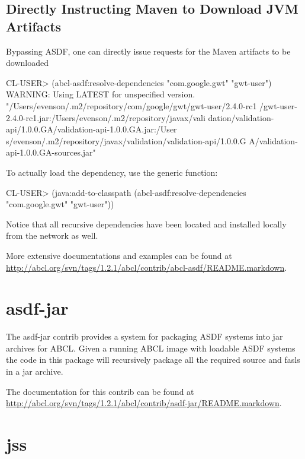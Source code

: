 \documentclass[10pt]{book}
\begin{document}
\subsection{Directly Instructing Maven to Download JVM Artifacts}

Bypassing \textsc{ASDF}, one can directly issue requests for the Maven
artifacts to be downloaded

\begin{listing-lisp}
CL-USER> (abcl-asdf:resolve-dependencies "com.google.gwt"
                                         "gwt-user")
WARNING: Using LATEST for unspecified version.
"/Users/evenson/.m2/repository/com/google/gwt/gwt-user/2.4.0-rc1
/gwt-user-2.4.0-rc1.jar:/Users/evenson/.m2/repository/javax/vali
dation/validation-api/1.0.0.GA/validation-api-1.0.0.GA.jar:/User
s/evenson/.m2/repository/javax/validation/validation-api/1.0.0.G
A/validation-api-1.0.0.GA-sources.jar"
\end{listing-lisp}

To actually load the dependency, use the  generic
function:

\begin{listing-lisp}
CL-USER> (java:add-to-classpath
          (abcl-asdf:resolve-dependencies "com.google.gwt"
                                          "gwt-user"))
\end{listing-lisp}

Notice that all recursive dependencies have been located and installed
locally from the network as well.

More extensive documentations and examples can be found at
\url{http://abcl.org/svn/tags/1.2.1/abcl/contrib/abcl-asdf/README.markdown}.


\section{asdf-jar}

The asdf-jar contrib provides a system for packaging \textsc{ASDF}
systems into jar archives for \textsc{ABCL}.  Given a running
\textsc{ABCL} image with loadable \textsc{ASDF} systems the code in
this package will recursively package all the required source and
fasls in a jar archive.

The documentation for this contrib can be found at
\url{http://abcl.org/svn/tags/1.2.1/abcl/contrib/asdf-jar/README.markdown}.


\section{jss}
\label{section:jss}
\end{document}
